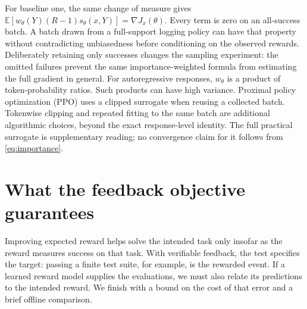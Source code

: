 \documentclass[11pt,twoside]{article}
\newcommand{\E}{\mathbb E}
\theoremstyle{definition}
\theoremstyle{remark}
\begin{document}
For baseline one, the same change of measure gives
$\E[w_\theta(Y)(R-1)s_\theta(x,Y)]=\nabla J_x(\theta)$.
Every term is zero on an all-success batch. A batch drawn from a
full-support logging policy can have that property without contradicting unbiasedness before
conditioning on the observed rewards. Deliberately retaining only successes
changes the sampling experiment: the omitted failures prevent the same
importance-weighted formula from estimating the full gradient in general.
For autoregressive responses, $w_\theta$ is a product of token-probability
ratios. Such products can have high variance. Proximal policy optimization
(PPO) uses a clipped surrogate when reusing a collected batch.
Tokenwise clipping and repeated fitting to
the same batch are additional algorithmic choices, beyond the exact
response-level identity. The full practical surrogate is supplementary
reading; no convergence claim for it follows from \cref{eq:importance}.

\section{What the feedback objective guarantees}
\label{sec:accuracy}

Improving expected reward helps solve the intended task only insofar as
the reward measures success on that task. With verifiable feedback, the
test specifies the target: passing a finite test suite, for example, is
the rewarded event. If a learned reward model supplies the evaluations,
we must also relate its predictions to the intended reward. We finish
with a bound on the cost of that error and a brief offline comparison.
\end{document}

